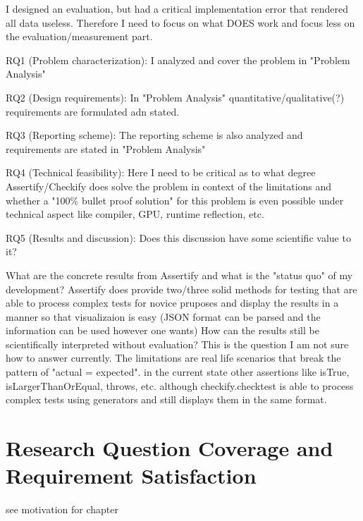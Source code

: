 \documentclass[
	bibliography=totoc,
	listof=totoc,
]{scrbook}
\begin{document}
\begin{justify}
I designed an evaluation, but had a critical implementation error that rendered all data useless.
Therefore I need to focus on what DOES work and focus less on the evaluation/measurement part.

RQ1 (Problem characterization):
I analyzed and cover the problem in "Problem Analysis"

RQ2 (Design requirements): In "Problem Analysis" quantitative/qualitative(?) requirements are formulated adn stated.

RQ3 (Reporting scheme): The reporting scheme is also analyzed and requirements are stated in "Problem Analysis"

RQ4 (Technical feasibility): Here I need to be critical as to what degree Assertify/Checkify does solve the problem in context of the limitations and
whether a "100\% bullet proof solution" for this problem is even possible under technical aspect like compiler, GPU, runtime reflection, etc.

RQ5 (Results and discussion): Does this discussion have some scientific value to it?

What are the concrete results from Assertify and what is the "status quo" of my development?
Assertify does provide two/three solid methods for testing that are able to process complex tests for novice pruposes and display the results in a manner so that visualizaion is easy
(JSON format can be parsed and the information can be used however one wants)
How can the results still be scientifically interpreted without evaluation?
This is the question I am not sure how to answer currently.
The limitations are real life scenarios that break the pattern of "actual = expected".
in the current state other assertions like isTrue, isLargerThanOrEqual, throws, etc.
although checkify.checktest is able to process complex tests using generators and still displays them in the same format.
\end{justify}


\section{Research Question Coverage and Requirement Satisfaction}


\begin{marker}\begin{justify}
see motivation for chapter
\end{justify}\end{marker}
\end{document}
